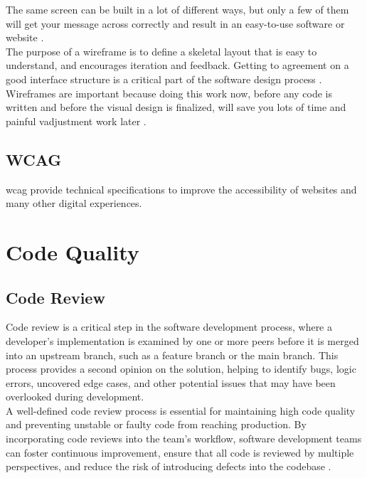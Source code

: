 {The same screen can be built in a lot of different ways, but only a few of them will get your message across correctly and result in an easy-to-use software or website \cite{balsamiq:wireframe}. \\

The purpose of a wireframe is to define a skeletal layout that is easy to understand, and encourages iteration and feedback. Getting to agreement on a good interface structure is a critical part of the software design process \cite{balsamiq:wireframe}. \\

Wireframes are important because doing this work now, before any code is written and before the visual design is finalized, will save you lots of time and painful vadjustment work later \cite{balsamiq:wireframe}.

\subsection{WCAG}
\label{subsec:wcag}

\gls{wcag} provide technical specifications to improve the accessibility of websites and many other digital experiences. \cite{levelaccess:wcag}

\section{Code Quality}
\label{sec:code-quality}

\subsection{Code Review}
\label{subsec:code-review}

Code review is a critical step in the software development process, where a developer's implementation is examined by one or more peers before it is merged into an upstream branch, such as a feature branch or the main branch. This process provides a second opinion on the solution, helping to identify bugs, logic errors, uncovered edge cases, and other potential issues that may have been overlooked during development. \cite{gitlab:code-review} \\

A well-defined code review process is essential for maintaining high code quality and preventing unstable or faulty code from reaching production. By incorporating code reviews into the team's workflow, software development teams can foster continuous improvement, ensure that all code is reviewed by multiple perspectives, and reduce the risk of introducing defects into the codebase \cite{gitlab:code-review}. \\

}
